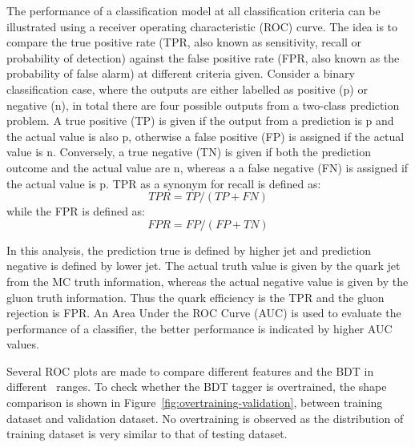 The performance of a classification model at all classification criteria can be illustrated using a receiver operating characteristic (ROC) curve. The idea is to compare the true positive rate (TPR, also known as sensitivity, recall or probability of detection) against the false positive rate (FPR, also known as the probability of false alarm) at different criteria given. Consider a binary classification case, where the outputs are either labelled as positive (p) or negative (n), in total there are four possible outputs from a two-class prediction problem. A true positive (TP) is given if the output from a prediction is p and the actual value is also p, otherwise a false positive (FP) is assigned if the actual value is n. Conversely, a true negative (TN) is given if both the prediction outcome and the actual value are n, whereas a a false negative (FN) is assigned if the actual value is p. TPR as a synonym for recall is defined as:
\begin{equation}
	TPR = TP/(TP+FN)
\end{equation}
while the FPR is defined as: 
\begin{equation}
	FPR = FP/(FP+TN)
\end{equation}

In this analysis, the prediction true is defined by higher \abseta jet and prediction negative is defined by lower \abseta jet. The actual truth value is given by the quark jet from the MC truth information, whereas the actual negative value is given by the gluon truth information. Thus the quark efficiency is the TPR and the gluon rejection is FPR. An Area Under the ROC Curve (AUC) is used to evaluate the performance of a classifier, the better performance is indicated by higher AUC values.

Several ROC plots are made to compare different features and the BDT in different \pt~ranges. 
To check whether the BDT tagger is overtrained, the shape comparison is shown in Figure~\ref{fig:overtraining-validation}, between training dataset and validation dataset.  
No overtraining is observed as the distribution of training dataset is very similar to that of testing dataset. 

